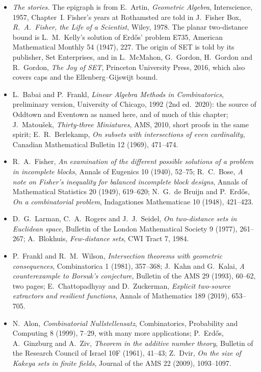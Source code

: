 \begin{itemize}
\item \emph{The stories.} The epigraph is from E.~Artin, \emph{Geometric Algebra}, Interscience, 1957, Chapter~I. Fisher's years at Rothamsted are told in J.~Fisher Box, \emph{R.~A.~Fisher, the Life of a
Scientist}, Wiley, 1978. The planar two-distance bound is L.~M.~Kelly's solution of Erd\H os' problem E735, American Mathematical Monthly 54 (1947), 227. The origin of SET is told by its publisher, Set
Enterprises, and in L.~McMahon, G.~Gordon, H.~Gordon and R.~Gordon, \emph{The Joy of SET}, Princeton University Press, 2016, which also covers caps and the Ellenberg--Gijswijt bound.
\item L.~Babai and P.~Frankl, \emph{Linear Algebra Methods in Combinatorics}, preliminary version, University of Chicago, 1992 (2nd ed.\ 2020): the source of Oddtown and Eventown as named here, and of much of this
chapter; J.~Matou\v{s}ek, \emph{Thirty-three Miniatures}, AMS, 2010, short proofs in the same spirit; E.~R.~Berlekamp, \emph{On subsets with intersections of even cardinality}, Canadian Mathematical Bulletin 12
(1969), 471--474.
\item R.~A.~Fisher, \emph{An examination of the different possible solutions of a problem in incomplete blocks}, Annals of Eugenics 10 (1940), 52--75; R.~C.~Bose, \emph{A note on Fisher's inequality for balanced
incomplete block designs}, Annals of Mathematical Statistics 20 (1949), 619--620; N.~G.~de Bruijn and P.~Erd\H os, \emph{On a combinatorial problem}, Indagationes Mathematicae 10 (1948), 421--423.
\item D.~G.~Larman, C.~A.~Rogers and J.~J.~Seidel, \emph{On two-distance sets in Euclidean space}, Bulletin of the London Mathematical Society 9 (1977), 261--267; A.~Blokhuis, \emph{Few-distance sets}, CWI Tract
7, 1984.
\item P.~Frankl and R.~M.~Wilson, \emph{Intersection theorems with geometric consequences}, Combinatorica 1 (1981), 357--368; J.~Kahn and G.~Kalai, \emph{A counterexample to Borsuk's conjecture}, Bulletin of the AMS 29
(1993), 60--62, two pages; E.~Chattopadhyay and D.~Zuckerman, \emph{Explicit two-source extractors and resilient functions}, Annals of Mathematics 189 (2019), 653--705.
\item N.~Alon, \emph{Combinatorial Nullstellensatz}, Combinatorics, Probability and Computing 8 (1999), 7--29, with many more applications; P.~Erd\H os, A.~Ginzburg and A.~Ziv, \emph{Theorem in the additive number
theory}, Bulletin of the Research Council of Israel 10F (1961), 41--43; Z.~Dvir, \emph{On the size of Kakeya sets in finite fields}, Journal of the AMS 22 (2009), 1093--1097.

\end{itemize}
